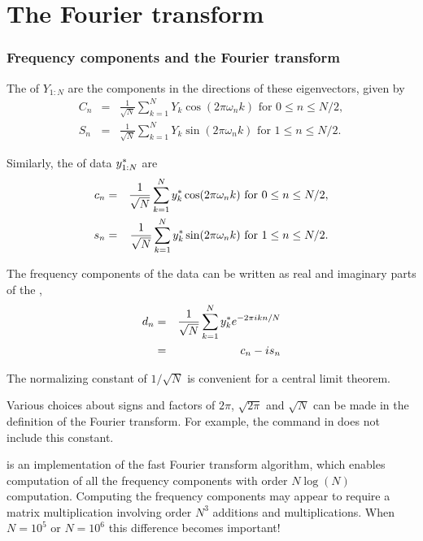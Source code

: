 \section{The Fourier transform}

\begin{frame}[fragile]
\frametitle{Frequency components and the Fourier transform}

\bi
\item  The  of $Y_{1:N}$ are the components in the directions of these eigenvectors, given by
\begin{eqnarray*}
C_n &=& \frac{1}{\sqrt{N}}\sum_{k=1}^N Y_k\cos(2\pi \omega_n k) \mbox{ for $0\le n\le N/2$},
\\
S_n &=& \frac{1}{\sqrt{N}}\sum_{k=1}^N Y_k\sin(2\pi \omega_n k) \mbox{ for $1\le n\le N/2$}.
\end{eqnarray*}

\item  Similarly, the  of data $y_{1:N}^*$ are 
\begin{eqnarray*}
{c_n} &=& \frac{1}{\sqrt{N}}\sum_{k=1}^N y_k^*\cos(2\pi \omega_n k) \mbox{ for $0\le n\le N/2$},
\\
{s_n} &=& \frac{1}{\sqrt{N}}\sum_{k=1}^N y_k^*\sin(2\pi \omega_n k) \mbox{ for $1\le n\le N/2$}.
\end{eqnarray*}

\ei

\end{frame}

\begin{frame}[fragile]
\bi
\item  The frequency components of the data can be written as real and imaginary parts of the ,
\begin{eqnarray*}
{d_n} &=& \frac{1}{\sqrt{N}} \sum_{k=1}^N y_k^* e^{-2\pi i k n/N}
\\
&=&{c_n} - i{s_n}
\end{eqnarray*}

\item  The normalizing constant of $1/\sqrt{N}$ is convenient for a central limit theorem.

\item Various choices about signs and factors of $2\pi$, $\sqrt{2\pi}$ and $\sqrt{N}$ can be made in the definition of the Fourier transform. For example, the  command in {\Rlanguage} does not include this constant. 

\item  {} is an implementation of the fast Fourier transform algorithm, which enables computation of all the frequency components with order $N\log(N)$ computation. Computing the frequency components may appear to require a matrix multiplication involving order $N^3$ additions and multiplications. When $N=10^5$ or $N=10^6$ this difference becomes important!

\ei

\end{frame}

